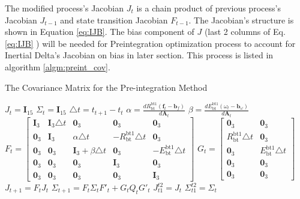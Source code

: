 \documentclass[12pt]{article}   %
\begin{document}
The modified process's Jacobian $J_{t}$ is a chain product of previous process's Jacobian $J_{t-1}$ and state transition Jacobian $F_{t-1}$. The Jacobian's structure is shown in Equation \ref{eq:IJB}. The bias component of $J$ (last 2 columns of Eq. \ref{eq:IJB} ) will be needed for Preintegration optimization process to account for Inertial Delta's Jacobian on bias in later section. This process is listed in algorithm \ref{algm:preint_cov}. \\


\begin{algorithm}[h!]
	\caption{The Covariance Matrix for the Pre-integration Method}
	\label{algm:preint_cov}
	\begin{algorithmic}%
		\STATE $J_t = \textbf{I}_{15}$ 
		\STATE ${\Sigma}_t = \textbf{I}_{15}$ 
		\STATE $\triangle t =  t_{t+1} - t_t$ 
		\STATE $\alpha = \frac{d R^{\mathrm{bt1}}_{\mathrm{bt}} (\textbf{f}_t - \textbf{b}_f)}{d \textbf{A}_t}$
		\STATE $\beta = \frac{d E^{\mathrm{bt1}}_{\mathrm{bt}} (\omega_t - \textbf{b}_\omega)}{d \textbf{A}_t}$
		\STATE $F_t = \begin{bmatrix} \textbf{I}_3 & \textbf{I}_3 \triangle t & \textbf{0}_3 & \textbf{0}_3 & \textbf{0}_3 \\ 
		\textbf{0}_3 & \textbf{I}_3  & \alpha \triangle t & -R^{\mathrm{bt1}}_{\mathrm{bt}} \triangle t & \textbf{0}_3 \\ 
		\textbf{0}_3 & \textbf{0}_3 & \textbf{I}_3 + \beta \triangle t & \textbf{0}_3 & -E^{\mathrm{bt1}}_{\mathrm{bt}} \triangle t \\
		\textbf{0}_3 & \textbf{0}_3 & \textbf{0}_3 & \textbf{I}_3 & \textbf{0}_3 \\
		\textbf{0}_3 & \textbf{0}_3 & \textbf{0}_3 & \textbf{0}_3 & \textbf{I}_3
		\end{bmatrix}$
		\STATE $G_t = \begin{bmatrix} \textbf{0}_3 & \textbf{0}_3 \\ R^{\mathrm{bt1}}_{\mathrm{bt}} \triangle t & \textbf{0}_3 \\ \textbf{0}_3 & E^{\mathrm{bt1}}_{\mathrm{bt}} \triangle t \\ \textbf{0}_3 & \textbf{0}_3 \\ \textbf{0}_3 & \textbf{0}_3 \end{bmatrix}$
		\STATE $J_{t+1} = F_{t} J_t$ 
		\STATE ${\Sigma}_{t+1} = F_{t} {\Sigma}_t F'_{t} + G_t Q_t G'_t$ 
		\ENDFOR
		\STATE $J^{t2}_{t1} = J_{t}$
		\STATE ${\Sigma}^{t2}_{t1} = {\Sigma}_{t}$
	\end{algorithmic}
\end{algorithm}
\end{document}
